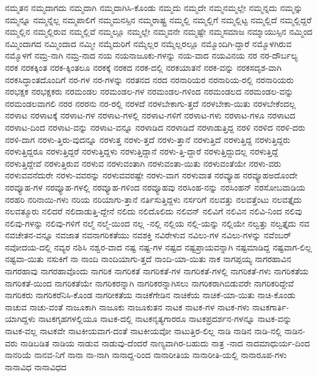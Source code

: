 {ನಮ್ಮತನ
ನಮ್ಮದಾಗದು
ನಮ್ಮದಾಗಿ
ನಮ್ಮದಾಗಿಸಿ-ಕೊಂಡು
ನಮ್ಮದು
ನಮ್ಮದೇ
ನಮ್ಮನಮ್ಮಲ್ಲೇ
ನಮ್ಮನ್ನದು
ನಮ್ಮನ್ನು
ನಮ್ಮನ್ನೂ
ನಮ್ಮನ್ನೆಲ್ಲ
ನಮ್ಮಪಾಲಿಗೆ
ನಮ್ಮಮನಸ್ಸಿನ
ನಮ್ಮರಾಷ್ಟ್ರ
ನಮ್ಮಲ್ಲಿ
ನಮ್ಮಲ್ಲಿಗೆ
ನಮ್ಮಲ್ಲಿಟ್ಟ
ನಮ್ಮಲ್ಲಿದೆ
ನಮ್ಮಲ್ಲಿದ್ದರೆ
ನಮ್ಮಲ್ಲಿನ
ನಮ್ಮಲ್ಲಿರುವ
ನಮ್ಮಲ್ಲಿವೆ
ನಮ್ಮಲ್ಲೂ
ನಮ್ಮಲ್ಲೇ
ನಮ್ಮವನೇ
ನಮ್ಮಷ್ಟೇ
ನಮ್ಮಸಮಾಜ
ನಮ್ಮಾಯುಸ್ಸಿನ
ನಮ್ಮಿಂದ
ನಮ್ಮಿಂದಾಗದ
ನಮ್ಮಿಂದಾದ
ನಮ್ಮೀ
ನಮ್ಮೆದುರಿಗೆ
ನಮ್ಮೆಲ್ಲರ
ನಮ್ಮೆಲ್ಲರಲ್ಲೂ
ನಮ್ಮೊಂದಿಗಿ-ದ್ದಾರೆ
ನಮ್ಮೊಳಗಿರುವ
ನಮ್ಮೊಳಗೆ
ನಮ್ರ-ನಾಗಿ
ನಮ್ರ-ನಾದ
ನಯ
ನಯನಾಜೂಕು-ಗಳನ್ನು
ನಯ-ವಾದ
ನಯವಿನಯ
ನರ
ನರ-ದೌರ್ಬಲ್ಯ
ನರಕ
ನರಕಕ್ಕಿಂತ
ನರಕ-ಕ್ಕಿಂತಲೂ
ನರಕಕ್ಕೆ
ನರಕದ
ನರಕ-ದಲ್ಲಿ
ನರಕಯಾತನೆ
ನರಕ-ವನ್ನು
ನರಕಸದೃಶ-ವಾಗಿ
ನರಕಸಿದ್ಧಾಂತದೊಂದಿಗೆ
ನರ-ಗಳ
ನರ-ಗಳನ್ನು
ನರತನದ
ನರದ
ನರನಾರಿಯರ
ನರನಾರಿಯ-ರಲ್ಲಿ
ನರನಾರಿಯರು
ನರಭಕ್ಷಕ
ನರಭಕ್ಷಕರು
ನರಮಂಡಲ
ನರಮಂಡಲ-ಗಳ
ನರಮಂಡಲ-ಗಳಿಂದ
ನರಮಂಡಲದ
ನರಮಂಡಲ-ವನ್ನು
ನರಮಂಡಲವಾಗಲಿ
ನರರ
ನರರನು
ನರ-ರಲ್ಲಿ
ನರಳದೆ
ನರಳಬೇಕಾಗು-ತ್ತದೆ
ನರಳಬೇಕಾ-ಯಿತು
ನರಳಬೇಕೆಂದಲ್ಲ
ನರಳಾಟ
ನರಳಾಟಕ್ಕೆ
ನರಳಾಟ-ಗಳ
ನರಳಾಟ-ಗಳಲ್ಲಿ
ನರಳಾಟ-ಗಳಿಗೆ
ನರಳಾಟ-ಗಳು
ನರಳಾಟ-ಗಳೂ
ನರಳಾಟದ
ನರಳಾಟ-ದಿಂದ
ನರಳಾಟ-ವನ್ನು
ನರಳಾಟ-ವನ್ನೂ
ನರಳಾಡಿದ
ನರಳಾಡಿದೆ
ನರಳಾಡುತ್ತಿದ್ದ
ನರಳಿ
ನರಳಿದ
ನರಳಿ-ದರು
ನರಳಿ-ದಾಗ
ನರಳು-ತ್ತಿರು-ವುದನ್ನೂ
ನರಳುತ್ತ
ನರಳು-ತ್ತದೆ
ನರಳು-ತ್ತಾನೆ
ನರಳುತ್ತಿದೆ
ನರಳುತ್ತಿದ್ದ
ನರಳುತ್ತಿದ್ದರು
ನರಳುತ್ತಿದ್ದರೂ
ನರಳುತ್ತಿದ್ದರೆ
ನರಳುತ್ತಿದ್ದಳು
ನರಳುತ್ತಿದ್ದಾನೆ
ನರಳು-ತ್ತಿ-ದ್ದಾರೆ
ನರಳುತ್ತಿದ್ದುದಲ್ಲ
ನರಳುತ್ತಿದ್ದೆ
ನರಳುತ್ತಿದ್ದೇವೆ
ನರಳುತ್ತಿರುವ
ನರಳುವ
ನರಳುವಂತಾಗಿ
ನರಳುವಂತಾ-ಯಿತು
ನರಳುವಂತೆಯೇ
ನರಳು-ವರು
ನರಳುವವನೆದುರೇ
ನರಳು-ವವರನ್ನು
ನರಳುವವರಷ್ಟೇ
ನರಳು-ವಾಗ
ನರಳುವಾತ
ನರವ್ಯೂಹ
ನರವ್ಯೂಹಅದೊಂದೇ
ನರವ್ಯೂಹ-ಗಳ
ನರವ್ಯೂಹ-ಗಳಲ್ಲಿ
ನರವ್ಯೂಹ-ಗಳಿಂದ
ನರವ್ಯೂಹವು
ನರಸಿಂಹ-ನನ್ನು
ನರಸಿಂಹನ್
ನರಸೋಬವಾಡಿಯ
ನರಹರಿ
ನರಿನಾಯಿ-ಗಳು
ನರಿಯ
ನರಿಯಾಗು-ತ್ತಾನೆ
ನರ್ತಿಸುತ್ತಿದ್ದಳು
ನರ್ಸರಿಗೆ
ನಲವತ್ತು
ನಲವತ್ತೆಂಟು
ನಲವತ್ತೈದು
ನಲವತ್ಮೂರು
ನಲಿದರೆ
ನಲಿದಾಡುತ್ತಿ-ದ್ದೇನೆ
ನಲಿದು
ನಲಿದೊಲಿದು
ನಲಿವನ್
ನಲಿವಿಗೆ
ನಲಿವಿನ
ನಲಿವಿ-ನಿಂದ
ನಲಿವು
ನಲಿವು-ಗಳನ್ನು
ನಲಿವು-ಗಳಿಗೆ
ನಲ್ಮೆ
ನಲ್ಮೆ-ಯಿಂದ
ನಲ್ಲ
-ನಲ್ಲಿ
ನಲ್ಲಿಯ
ನಲ್ಲಿ-ಯನ್ನು
ನಲ್ಲಿಯೇ
ನಲ್ವತ್ತು
ನಲ್ವತ್ತೈದು
ನವ
ನವಚೇತನ-ವನ್ನೂ
ನವಜಾತ
ನವನಾಗರಿಕತೆಯು
ನವಶಕ್ತಿ
ನವಿರೇಳುವ
ನವಿಲು-ಗಳ
ನವಿಲು-ಗಳನ್ನು
ನವೆಂಬರ್
ನವೋದಯ-ದಲ್ಲಿ
ನವ್ಯರ
ನಶಿಸಿ
ನಶ್ವರ-ವಾದ
ನಷ್ಟ
ನಷ್ಟ-ಗಳ
ನಷ್ಟದ
ನಷ್ಟಪ್ರಾಯವನ್ನಾಗಿ
ನಷ್ಟಮಾಡಿದ್ದ
ನಷ್ಟವಾಗ-ಲಿಲ್ಲ
ನಷ್ಟವಾ-ಯಿತು
ನಸುಕಿಗೆ
ನಾ
ನಾಂದಿ
ನಾಂದಿಯಾಗು-ತ್ತದೆ
ನಾಂದಿ-ಯಾ-ಯಿತು
ನಾಕ
ನಾಗಪ್ಪಯ್ಯ
ನಾಗರಹಾವಿನ
ನಾಗರಹಾವು
ನಾಗರಹಾವೊಂದು
ನಾಗರಿಕ
ನಾಗರಿಕತೆ
ನಾಗರಿಕತೆ-ಗಳ
ನಾಗರಿಕತೆ-ಗಳಲ್ಲಿ
ನಾಗರಿಕತೆ-ಗಳು
ನಾಗರಿಕತೆಯ
ನಾಗರಿಕತೆ-ಯಿಂದ
ನಾಗರಿಕತೆಯೇ
ನಾಗರಿಕರನ್ನಾಗಿ
ನಾಗರಿಕರನ್ನಾಗಿಸಲು
ನಾಗರಿಕರಾಗಿಬಿಡುವರೇ
ನಾಗರಿಕರಿದ್ದೇವೆ
ನಾಗರಿಕರು
ನಾಗರಿಕರೆನಿಸಿ-ಕೊಂಡ
ನಾಗರೀಕತೆಯ
ನಾಚಿಕೆಗೇಡಿನ
ನಾಚಿಕೆಯ
ನಾಚಿಕೆ-ಯಾ-ಯಿತು
ನಾಚಿ-ಕೊಂಡು
ನಾಚುವ
ನಾಚು-ವಂತೆ
ನಾಜೂಕಾಗಿ
ನಾಜೂಕು
ನಾಜೂಕುತನ
ನಾಟಕ
ನಾಟಕ-ಗಳ
ನಾಟಕ-ಗಳು
ನಾಟಕಗಾರ್ತಿ-ಯಾಗಿದ್ದಳು
ನಾಟಕಗೃಹಗಳಲ್ಲಿಯೂ
ನಾಟಕ-ದಲ್ಲಿ
ನಾಟಕನೃತ್ಯಗಾರರೂ
ನಾಟಕಪ್ರದರ್ಶನ-ಗಳನ್ನೂ
ನಾಟಕ-ವನ್ನು
ನಾಟಕ-ವಲ್ಲ
ನಾಟಕವೇ
ನಾಟಕೀಯವಾಗ-ದಂತೆ
ನಾಟಕೀಯವೋ
ನಾಟುತ್ತಿರ-ಲಿಲ್ಲ
ನಾಡಿ
ನಾಡಿನ
ನಾಡಿ-ನಲ್ಲಿ
ನಾಡಿನ-ವರು
ನಾಡಿಬಡಿತ
ನಾಡಿಯ
ನಾಡುವ
ನಾಡುವು-ದೆಂದರೆ
ನಾಣ್ಯವಾಗಿರ-ಬಹುದು
ನಾತ್ರ
-ನಾದ
ನಾದಮಾಧುರ್ಯ-ದಿಂದ
ನಾನರಿಯೆ
ನಾನವ-ನಿಗೆ
ನಾನಾ
ನಾ-ನಾಗಿ
ನಾನಾದ್ದ-ರಿಂದ
ನಾನಾರೀತಿಯ
ನಾನಾರೀತಿ-ಯಲ್ಲಿ
ನಾನಾರೂಪ-ಗಳು
ನಾನಾವಿಧ
ನಾನಾವಿಧದ
}
